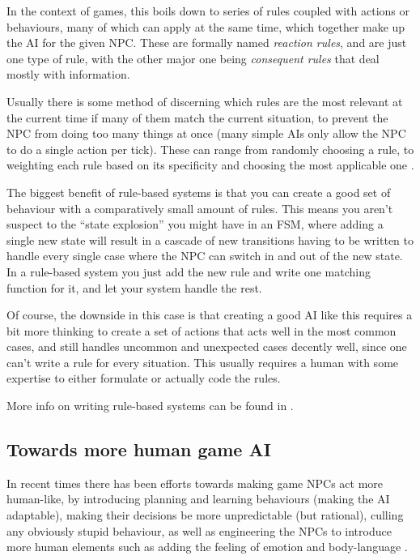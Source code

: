 In the context of games, this boils down to series of rules coupled with actions
or behaviours, many of which can apply at the same time, which together make up
the AI for the given NPC. These are formally named \emph{reaction rules}, and
are just one type of rule, with the other major one being \emph{consequent
  rules} that deal mostly with information.

Usually there is some method of discerning which rules are the most relevant at
the current time if many of them match the current situation, to prevent the NPC
from doing too many things at once (many simple AIs only allow the NPC to do a
single action per tick). These can range from randomly choosing a rule, to
weighting each rule based on its specificity and choosing the most applicable
one \citep{Freeman-Hargis}.

The biggest benefit of rule-based systems is that you can create a good set of
behaviour with a comparatively small amount of rules. This means you aren't
suspect to the ``state explosion'' you might have in an FSM, where adding a
single new state will result in a cascade of new transitions having to be
written to handle every single case where the NPC can switch in and out of the
new state. In a rule-based system you just add the new rule and write one
matching function for it, and let your system handle the rest.

Of course, the downside in this case is that creating a good AI like this
requires a bit more thinking to create a set of actions that acts well in the
most common cases, and still handles uncommon and unexpected cases decently
well, since one can't write a rule for every situation. This usually requires a
human with some expertise to either formulate or actually code the rules.

More info on writing rule-based systems can be found in
\citet[chap.~4]{kirby2011introduction}.

\subsection{Towards more human game AI}
\label{sec:towards-more-human}

In recent times there has been efforts towards making game NPCs act more
human-like, by introducing planning and learning behaviours (making the AI
adaptable), making their decisions be more unpredictable (but rational), culling
any obviously stupid behaviour, as well as engineering the NPCs to introduce
more human elements such as adding the feeling of emotion and body-language
\citep{spronck2005adaptive}.

